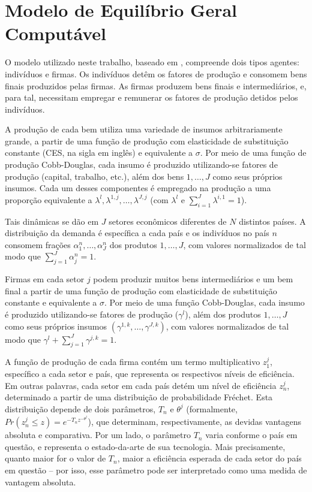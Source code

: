 \documentclass{article}
\begin{document}
\section{Modelo de Equilíbrio Geral Computável}

O modelo utilizado neste trabalho, baseado em \textcite{caliendo}, compreende dois tipos agentes: indivíduos e firmas. Os indivíduos detêm os fatores de produção e consomem bens finais produzidos pelas firmas. As firmas produzem bens finais e intermediários, e, para tal, necessitam empregar e remunerar os fatores de produção detidos pelos indivíduos.

A produção de cada bem utiliza uma variedade de insumos arbitrariamente grande, a partir de uma função de produção com elasticidade de substituição constante (CES, na sigla em inglês) e equivalente a $\sigma$. Por meio de uma função de produção Cobb-Douglas, cada insumo é produzido utilizando-se fatores de produção (capital, trabalho, etc.), além dos bens $1,\ldots,J$ como seus próprios insumos. Cada um desses componentes é empregado na produção a uma proporção equivalente a $\lambda^l, \lambda^{1,j}, \hdots, \lambda^{J,j}$ (com $\lambda^l$ e $\sum_{i=1}^J \lambda^{i,1} = 1$).

Tais dinâmicas se dão em $J$ setores econômicos diferentes de $N$ distintos países. A distribuição da demanda é específica a cada país e os indivíduos no país $n$ consomem frações  $\alpha^n_1 , \hdots , \alpha^n_J$ dos produtos $1 , \hdots , J$, com valores normalizados de tal modo que $\sum_{j=1}^J \alpha^n_j = 1$.

Firmas em cada setor $j$ podem produzir muitos bens intermediários e um bem final a partir de uma função de produção com elasticidade de substituição constante e equivalente a $\sigma$. Por meio de uma função Cobb-Douglas, cada insumo é produzido utilizando-se fatores de produção ($\gamma ^ l$), além dos produtos $1, \hdots , J$ como seus próprios insumos $(\gamma ^ {1,k}, \hdots , \gamma ^ {J,k})$, com valores normalizados de tal modo que $\gamma ^ l + \sum_{j=1}^J \gamma ^{j,k} = 1$.


A função de produção de cada firma contém um termo multiplicativo $z_1^j$, específico a cada setor e país, que representa os respectivos níveis de eficiência. Em outras palavras, cada setor em cada país detém um nível de eficiência $z_n^j$, determinado a partir de uma distribuição de probabilidade Fréchet. Esta distribuição depende de dois parâmetros, $T_n$ e $\theta ^j$ (formalmente, $Pr(z_n^j \leq z) = e^{-T_n z^{ -\theta^j } }$), que determinam, respectivamente, as devidas vantagens absoluta e comparativa. Por um lado, o parâmetro $T_n$ varia conforme o país em questão, e representa o estado-da-arte de sua tecnologia. Mais precisamente, quanto maior for o valor de $T_n$, maior a eficiência esperada de cada setor do país em questão – por isso, esse parâmetro pode ser interpretado como uma medida de vantagem absoluta.
\end{document}

